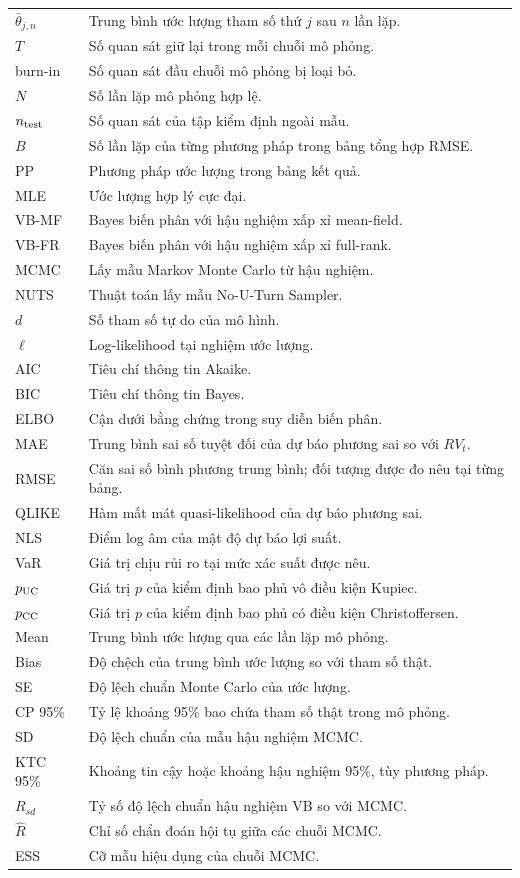 \documentclass[11pt,a4paper]{article}
\begin{document}
\begin{longtable}{@{}p{}p{}@{}}
$\bar\theta_{j,n}$ & Trung bình ước lượng tham số thứ $j$ sau $n$ lần lặp. \\
$T$ & Số quan sát giữ lại trong mỗi chuỗi mô phỏng. \\
burn-in & Số quan sát đầu chuỗi mô phỏng bị loại bỏ. \\
$N$ & Số lần lặp mô phỏng hợp lệ. \\
$n_{\rm test}$ & Số quan sát của tập kiểm định ngoài mẫu. \\
$B$ & Số lần lặp của từng phương pháp trong bảng tổng hợp RMSE. \\
PP & Phương pháp ước lượng trong bảng kết quả. \\
MLE & Ước lượng hợp lý cực đại. \\
VB-MF & Bayes biến phân với hậu nghiệm xấp xỉ mean-field. \\
VB-FR & Bayes biến phân với hậu nghiệm xấp xỉ full-rank. \\
MCMC & Lấy mẫu Markov Monte Carlo từ hậu nghiệm. \\
NUTS & Thuật toán lấy mẫu No-U-Turn Sampler. \\
$d$ & Số tham số tự do của mô hình. \\
$\ell$ & Log-likelihood tại nghiệm ước lượng. \\
AIC & Tiêu chí thông tin Akaike. \\
BIC & Tiêu chí thông tin Bayes. \\
ELBO & Cận dưới bằng chứng trong suy diễn biến phân. \\
MAE & Trung bình sai số tuyệt đối của dự báo phương sai so với $RV_t$. \\
RMSE & Căn sai số bình phương trung bình; đối tượng được đo nêu tại từng bảng. \\
QLIKE & Hàm mất mát quasi-likelihood của dự báo phương sai. \\
NLS & Điểm log âm của mật độ dự báo lợi suất. \\
VaR & Giá trị chịu rủi ro tại mức xác suất được nêu. \\
$p_{\rm UC}$ & Giá trị $p$ của kiểm định bao phủ vô điều kiện Kupiec. \\
$p_{\rm CC}$ & Giá trị $p$ của kiểm định bao phủ có điều kiện Christoffersen. \\
Mean & Trung bình ước lượng qua các lần lặp mô phỏng. \\
Bias & Độ chệch của trung bình ước lượng so với tham số thật. \\
SE & Độ lệch chuẩn Monte Carlo của ước lượng. \\
CP 95\% & Tỷ lệ khoảng 95\% bao chứa tham số thật trong mô phỏng. \\
SD & Độ lệch chuẩn của mẫu hậu nghiệm MCMC. \\
KTC 95\% & Khoảng tin cậy hoặc khoảng hậu nghiệm 95\%, tùy phương pháp. \\
$R_{sd}$ & Tỷ số độ lệch chuẩn hậu nghiệm VB so với MCMC. \\
$\hat R$ & Chỉ số chẩn đoán hội tụ giữa các chuỗi MCMC. \\
ESS & Cỡ mẫu hiệu dụng của chuỗi MCMC. \\
\bottomrule
\end{longtable}
\normalsize
\clearpage
\end{document}
